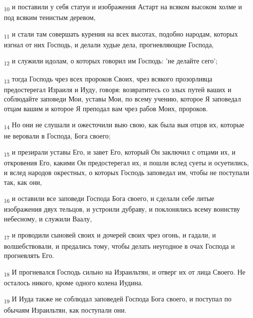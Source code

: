 \begin{tcolorbox}
\textsubscript{10} и поставили у себя статуи и изображения Астарт на всяком высоком холме и под всяким тенистым деревом,
\end{tcolorbox}
\begin{tcolorbox}
\textsubscript{11} и стали там совершать курения на всех высотах, подобно народам, которых изгнал от них Господь, и делали худые дела, прогневляющие Господа,
\end{tcolorbox}
\begin{tcolorbox}
\textsubscript{12} и служили идолам, о которых говорил им Господь: 'не делайте сего';
\end{tcolorbox}
\begin{tcolorbox}
\textsubscript{13} тогда Господь чрез всех пророков Своих, чрез всякого прозорливца предостерегал Израиля и Иуду, говоря: возвратитесь со злых путей ваших и соблюдайте заповеди Мои, уставы Мои, по всему учению, которое Я заповедал отцам вашим и которое Я преподал вам чрез рабов Моих, пророков.
\end{tcolorbox}
\begin{tcolorbox}
\textsubscript{14} Но они не слушали и ожесточили выю свою, как была выя отцов их, которые не веровали в Господа, Бога своего;
\end{tcolorbox}
\begin{tcolorbox}
\textsubscript{15} и презирали уставы Его, и завет Его, который Он заключил с отцами их, и откровения Его, какими Он предостерегал их, и пошли вслед суеты и осуетились, и вслед народов окрестных, о которых Господь заповедал им, чтобы не поступали так, как они,
\end{tcolorbox}
\begin{tcolorbox}
\textsubscript{16} и оставили все заповеди Господа Бога своего, и сделали себе литые изображения двух тельцов, и устроили дубраву, и поклонялись всему воинству небесному, и служили Ваалу,
\end{tcolorbox}
\begin{tcolorbox}
\textsubscript{17} и проводили сыновей своих и дочерей своих чрез огонь, и гадали, и волшебствовали, и предались тому, чтобы делать неугодное в очах Господа и прогневлять Его.
\end{tcolorbox}
\begin{tcolorbox}
\textsubscript{18} И прогневался Господь сильно на Израильтян, и отверг их от лица Своего. Не осталось никого, кроме одного колена Иудина.
\end{tcolorbox}
\begin{tcolorbox}
\textsubscript{19} И Иуда также не соблюдал заповедей Господа Бога своего, и поступал по обычаям Израильтян, как поступали они.
\end{tcolorbox}
